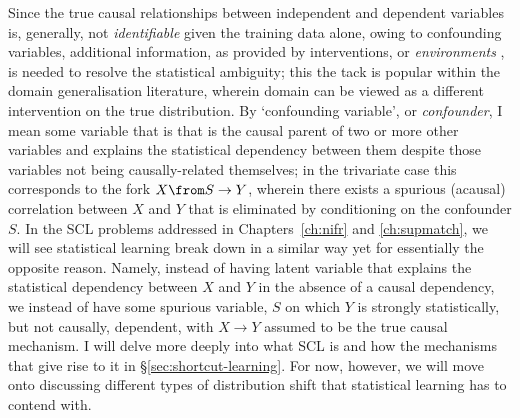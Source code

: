 Since the true causal relationships between independent and dependent variables is, generally, not
\emph{identifiable} given the training data alone, owing to confounding variables, additional
information, as provided by interventions, or \emph{environments} \citep{peters2016causal}, is
needed to resolve the statistical ambiguity; this  the tack is popular within the domain
generalisation literature, wherein domain can be viewed as a different intervention on the true
distribution.
%
By `confounding variable', or \emph{confounder}, I mean some variable that is that is the causal
parent of two or more other variables and explains the statistical dependency between them despite
those variables not being causally-related themselves; in the trivariate case this corresponds to
the fork \(X \from S \to Y \), wherein there exists a spurious (acausal) correlation between \(X\)
and \(Y\) that is eliminated by conditioning on the confounder \(S\).
%
In the \ac{SCL} problems addressed in Chapters~\ref{ch:nifr} and \ref{ch:supmatch}, we will see
statistical learning break down in a similar way yet for essentially the opposite reason.
%
Namely, instead of having latent variable that explains the statistical dependency between \(X\)
and \(Y\) in the absence of a causal dependency, we instead of have some spurious variable, \(S\)
on which \(Y\) is strongly statistically, but not causally, dependent, with \(X \to Y \) assumed to
be the true causal mechanism.
%
I will delve more deeply into what \ac{SCL} is and how the mechanisms that give rise to it in
\S\ref{sec:shortcut-learning}.
%
For now, however, we will move onto discussing different types of distribution shift that
statistical learning has to contend with.



